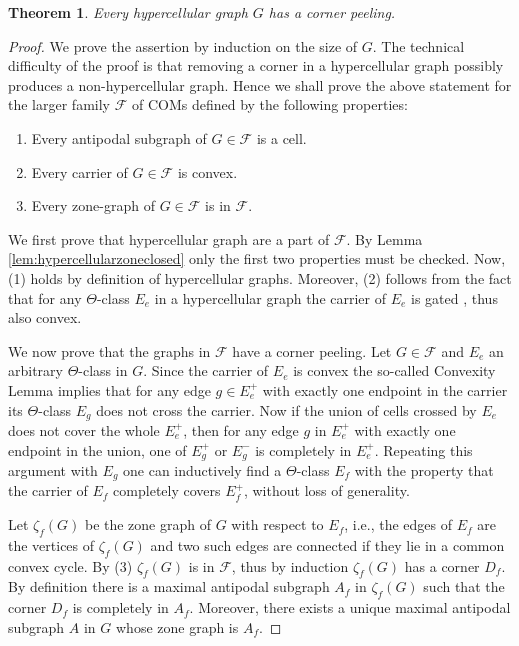 \documentclass[final,11pt]{article}
\newtheorem{thm}{Theorem}[section]
\begin{document}
\begin{thm}\label{thm:hypercellular}
Every hypercellular graph $G$ has a corner peeling.
\end{thm}
\begin{proof}
We prove the assertion by induction on the size of $G$. The technical difficulty of the proof is that removing a corner in a hypercellular graph possibly produces a non-hypercellular graph. Hence we shall prove the above statement for the larger family $\mathcal{F}$ of COMs defined by the following properties:
\begin{enumerate}[(1)]
\item Every antipodal subgraph of $G\in\mathcal{F}$ is a cell.
\item Every carrier of $G\in\mathcal{F}$ is convex.
\item Every zone-graph of $G\in\mathcal{F}$ is in $\mathcal{F}$.
\end{enumerate}

We first prove that hypercellular graph are a part of $\mathcal{F}$. By Lemma \ref{lem:hypercellularzoneclosed} only the first two properties must be checked. Now, (1) holds by definition of hypercellular graphs. Moreover, (2) follows from the fact that for any $\Theta$-class $E_e$ in a hypercellular graph the carrier of $E_e$  is gated \cite[Proposition 7]{Che-16}, thus also convex.
 
We now prove that the graphs in $\mathcal{F}$ have a corner peeling. Let $G \in \mathcal{F}$ and $E_e$ an arbitrary $\Theta$-class in $G$. Since the carrier of $E_e$ is convex the so-called Convexity Lemma \cite{imrich1998convexity} implies that for any edge $g\in E_e^+$ with exactly one endpoint in the carrier its $\Theta$-class $E_g$ does not cross the carrier.
 Now if the union of cells crossed by $E_e$ does not cover the whole $E_e^+$, then for any edge $g$ in $E_e^+$ with exactly one endpoint in the union, one of $E_g^+$ or $E_g^-$ is completely in $E_e^+$. Repeating this argument with $E_g$ one can inductively find a $\Theta$-class $E_f$ with the property that the carrier of $E_f$ completely covers $E_f^+$, without loss of generality.

 Let $\zeta_f(G)$ be the zone graph of $G$ with respect to $E_f$, i.e., the edges of $E_f$ are the vertices of $\zeta_f(G)$ and two such edges are connected if they lie in a common convex cycle. By (3) $\zeta_f(G)$ is in $\mathcal{F}$, thus by induction $\zeta_f(G)$ has a corner $D_f$. By definition there is a maximal antipodal subgraph $A_f$ in $\zeta_f(G)$ such that the corner $D_f$ is completely in $A_f$. Moreover, there exists a unique maximal antipodal subgraph $A$ in $G$ whose zone graph is $A_f$.


\end{proof}
\end{document}
